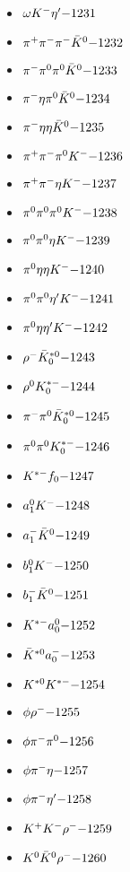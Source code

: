 \begin{multicols}{3}
\begin{itemize}
 \item $ \omega K^{-} {\eta^{\prime}} \hfill{-1231}$
 \item $ \pi^{+} \pi^{-} \pi^{-} \bar{K}^{0} \hfill{-1232}$
 \item $ \pi^{-} \pi^{0} \pi^{0} \bar{K}^{0} \hfill{-1233}$
 \item $ \pi^{-} \eta \pi^{0} \bar{K}^{0} \hfill{-1234}$
 \item $ \pi^{-} \eta \eta \bar{K}^{0} \hfill{-1235}$
 \item $ \pi^{+} \pi^{-} \pi^{0} K^{-} \hfill{-1236}$
 \item $ \pi^{+} \pi^{-} \eta K^{-} \hfill{-1237}$
 \item $ \pi^{0} \pi^{0} \pi^{0} K^{-} \hfill{-1238}$
 \item $ \pi^{0} \pi^{0} \eta K^{-} \hfill{-1239}$
 \item $ \pi^{0} \eta \eta K^{-} \hfill{-1240}$
 \item $ \pi^{0} \pi^{0} {\eta^{\prime}} K^{-} \hfill{-1241}$
 \item $ \pi^{0} \eta {\eta^{\prime}} K^{-} \hfill{-1242}$
 \item $ \rho^{-} \bar{K}_{0}^{*0} \hfill{-1243}$
 \item $ \rho^{0} K_{0}^{*-} \hfill{-1244}$
 \item $ \pi^{-} \pi^{0} \bar{K}_{0}^{*0} \hfill{-1245}$
 \item $ \pi^{0} \pi^{0} K_{0}^{*-} \hfill{-1246}$
 \item $ K^{*-} f_{0} \hfill{-1247}$
 \item $ a_{1}^{0} K^{-} \hfill{-1248}$
 \item $ a_{1}^{-} \bar{K}^{0} \hfill{-1249}$
 \item $ b_{1}^{0} K^{-} \hfill{-1250}$
 \item $ b_{1}^{-} \bar{K}^{0} \hfill{-1251}$
 \item $ K^{*-} a_{0}^{0} \hfill{-1252}$
 \item $ \bar{K}^{*0} a_{0}^{-} \hfill{-1253}$
 \item $ K^{*0} K^{*-} \hfill{-1254}$
 \item $ \phi \rho^{-} \hfill{-1255}$
 \item $ \phi \pi^{-} \pi^{0} \hfill{-1256}$
 \item $ \phi \pi^{-} \eta \hfill{-1257}$
 \item $ \phi \pi^{-} {\eta^{\prime}} \hfill{-1258}$
 \item $ K^{+} K^{-} \rho^{-} \hfill{-1259}$
 \item $ K^{0} \bar{K}^{0} \rho^{-} \hfill{-1260}$

\end{itemize}
\end{multicols}
